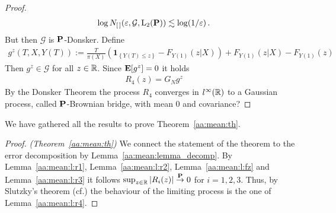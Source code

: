 \begin{proof}
\begin{gather}
    \log N_{[\,]}(\varepsilon, \mathcal{G},\mathrm{L}_2(\P))
    \lesssim
    \log(1/\varepsilon)
    \,.
\end{gather}
But then $\mathcal{G}$ is $\P$-Donsker.
Define
\begin{gather}
  g^z(T,X,Y(T))
    :=
    \frac{T}{\pi(X)}
    \left( 
      \mathbf{1}_{\left\{ Y(T)\le z \right\}}
      -
      F_{Y(1)}(z|X)
    \right)
    +
    F_{Y(1)}(z|X)
-
      F_{Y(1)}(z)
\end{gather}
Then $g^z\in\mathcal{G}$ for all $z\in \R$.
Since $\E[g^z]=0$ it holds
\begin{gather}
  R_4(z)=G_N g^z
\end{gather}
By the Donsker Theorem \cite[Theorem~19.5]{Vaart2000}
the process $R_4$ converges in $l^\infty(\R)$ to a Gaussian process, called $\P$-Brownian bridge, with mean 0 and covariance?
\end{proof}
We have gathered all the results to prove Theorem~\ref{aa:mean:th}.
\begin{proof}
  \emph{(Theorem~\ref{aa:mean:th})}
  We connect the statement of the theorem to the error decomposition by Lemma~\ref{aa:mean:lemma_decomp}.
  By Lemma~\ref{aa:mean:l:r1}, Lemma~\ref{aa:mean:l:r2},
   Lemma~\ref{aa:mean:l:fz} and Lemma~\ref{aa:mean:l:r3}
   it follows 
   $\sup_{z\in\R}|R_i(z)|\overset{\P}{\to}0$ for $i=1,2,3$.
   Thus, by Slutzky's theorem (cf.\cite[Theorem~13.8]{Klenke2020})
   the behaviour of the limiting process is the one of Lemma~\ref{aa:mean:l:r4}.
\end{proof}
